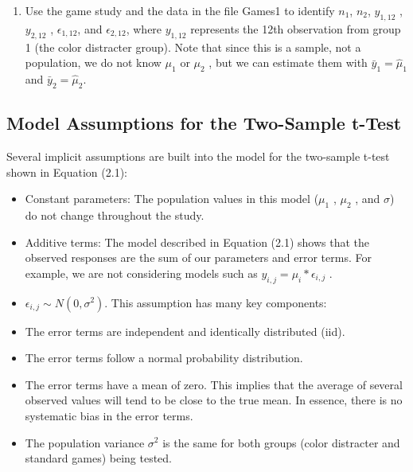 \documentclass[
]{report}
\providecommand{\tightlist}{%
  \setlength{\itemsep}{0pt}\setlength{\parskip}{0pt}}
\theoremstyle{definition}
\theoremstyle{definition}
\theoremstyle{definition}
\theoremstyle{definition}
\theoremstyle{remark}
\begin{document}
\begin{enumerate}
\def\labelenumi{\arabic{enumi}.}
\setcounter{enumi}{5}
\tightlist
\item
  Use the game study and the data in the file Games1 to identify \(n_1\), \(n_2\), \(y_{1,12}\) , \(y_{2,12}\) , \(\epsilon_{1, 12}\), and \(\epsilon_{2, 12}\),
  where \(y_{1,12}\) represents the 12th observation from group 1 (the color distracter group). Note that since this is a sample, not a population, we do not know \(\mu_1\) or \(\mu_2\) , but we can estimate them with \(\bar{y}_1 = \hat{\mu}_1\) and \(\bar{y}_2 = \hat{\mu}_2\).
\end{enumerate}

\hypertarget{model-assumptions-for-the-two-sample-t-test}{%
\subsection{Model Assumptions for the Two-Sample t-Test}\label{model-assumptions-for-the-two-sample-t-test}}

Several implicit assumptions are built into the model for the two-sample t-test shown in Equation (2.1):

\begin{itemize}
\tightlist
\item
  Constant parameters: The population values in this model (\(\mu_1\) , \(\mu_2\) , and \(\sigma\)) do not change throughout the study.
\item
  Additive terms: The model described in Equation (2.1) shows that the observed responses are the sum of our parameters and error terms. For example, we are not considering models such as
  \(y_{i, j} = \mu_i * \epsilon_{i, j}\) .
\item
  \(\epsilon_{i, j} \sim N(0,\sigma^2)\). This assumption has many key components:
\item
  The error terms are independent and identically distributed (iid).
\item
  The error terms follow a normal probability distribution.
\item
  The error terms have a mean of zero. This implies that the average of several observed values will tend to be close to the true mean. In essence, there is no systematic bias in the error terms.
\item
  The population variance \(\sigma^2\) is the same for both groups (color distracter and standard games) being tested.
\end{itemize}
\end{document}
